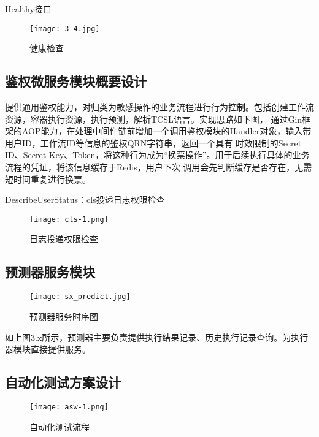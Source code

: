 Healthy接口
\begin{figure}[H]
    \centering
    \texttt{[image: 3-4.jpg]}
    \caption{健康检查}
    \label{fig:健康检查}
\end{figure}

\subsection{鉴权微服务模块概要设计}

提供通用鉴权能力，对归类为敏感操作的业务流程进行行为控制。包括创建工作流资源，容器执行资源，执行预测，解析TCSL语言。实现思路如下图，
通过Gin框架的AOP能力，在处理中间件链前增加一个调用鉴权模块的Handler对象，输入带用户ID，工作流ID等信息的鉴权QRN字符串，返回一个具有
时效限制的Secret ID、Secret Key、Token，将这种行为成为“换票操作”。用于后续执行具体的业务流程的凭证，将该信息缓存于Redis，用户下次
调用会先判断缓存是否存在，无需短时间重复进行换票。

DescribeUserStatus：cls投递日志权限检查

\begin{figure}[H]
    \centering
    \texttt{[image: cls-1.png]}
    \caption{日志投递权限检查}
    \label{fig:rztdqx}
\end{figure}


\subsection{预测器服务模块}

\begin{figure}[H]
    \centering
    \texttt{[image: sx\_predict.jpg]}
    \caption{预测器服务时序图}
    \label{fig:预测器服务时序图}
\end{figure}

如上图3.x所示，预测器主要负责提供执行结果记录、历史执行记录查询。为执行器模块直接提供服务。\cite{le2021deep}



\subsection{自动化测试方案设计}

\begin{figure}[H]
    \centering
    \texttt{[image: asw-1.png]}
    \caption{自动化测试流程}
    \label{fig:自动化测试流程}
\end{figure}



